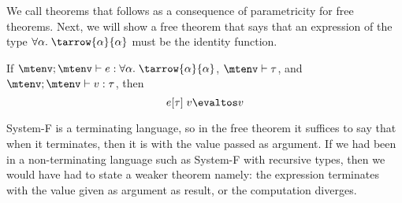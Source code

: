 We call theorems that follows as a consequence of parametricity for free theorems. Next, we will show a free theorem that says that an expression of the type $\forall \alpha. \; \tarrow{\alpha}{\alpha}$ must be the identity function.

\begin{theorem} If $\mtenv; \mtenv \vdash e : \forall \alpha.\; \tarrow{\alpha}{\alpha}$, $\mtenv \vdash \tau$, and $\mtenv; \mtenv \vdash v : \tau$, then
\[
  e[\tau] \; v \evaltos v
\]
\end{theorem}
System-F is a terminating language, so in the free theorem it suffices to say that when it terminates, then it is with the value passed as argument. If we had been in a non-terminating language such as System-F with recursive types, then we would have had to state a weaker theorem namely: the expression terminates with the value given as argument as result, or the computation diverges.

